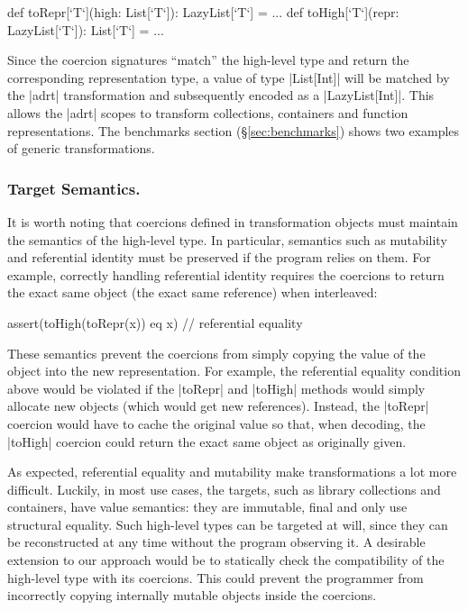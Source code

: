 \begin{lstlisting-nobreak}
  def toRepr[`T`](high: List[`T`]): LazyList[`T`] = ...
  def toHigh[`T`](repr: LazyList[`T`]): List[`T`] = ...
\end{lstlisting-nobreak}

Since the coercion signatures ``match'' the high-level type and return the corresponding representation type, a value of type |List[Int]| will be matched by the |adrt| transformation and subsequently encoded as a |LazyList[Int]|. This allows the |adrt| scopes to transform collections, containers and function representations. The benchmarks section (\S\ref{sec:benchmarks}) shows two examples of generic transformations.

\subsubsection{Target Semantics.} It is worth noting that coercions defined in transformation objects must maintain the semantics of the high-level type. In particular, semantics such as mutability and referential identity must be preserved if the program relies on them. For example, correctly handling referential identity requires the coercions to return the exact same object (the exact same reference) when interleaved:

\begin{lstlisting-nobreak}
assert(toHigh(toRepr(x)) eq x) // referential equality
\end{lstlisting-nobreak}

These semantics prevent the coercions from simply copying the value of the object into the new representation.
For example, the referential equality condition above would be violated if the |toRepr| and |toHigh| methods would simply allocate new objects (which would get new references). Instead, the |toRepr| coercion would have to cache the original value so that, when decoding, the |toHigh| coercion could return the exact same object as originally given.

As expected, referential equality and mutability make transformations a lot more difficult. Luckily, in most use cases, the targets, such as library collections and containers, have value semantics: they are immutable, final and only use structural equality. Such high-level types can be targeted at will, since they can be reconstructed at any time without the program observing it. A desirable extension to our approach would be to statically check the compatibility of the high-level type with its coercions. This could prevent the programmer from incorrectly copying internally mutable objects inside the coercions.

